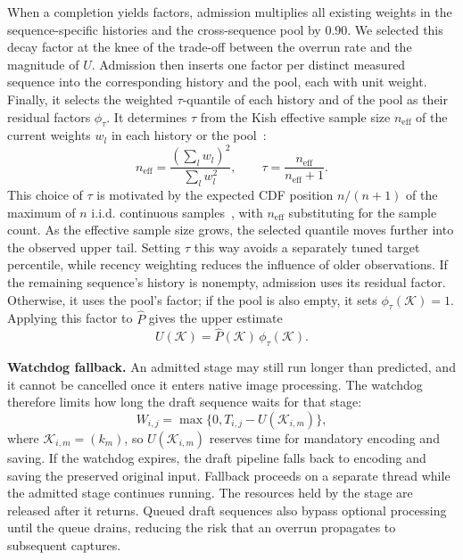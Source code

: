 When a completion yields factors, admission multiplies all existing weights in the sequence-specific histories and the cross-sequence pool by \(0.90\).
We selected this decay factor at the knee of the trade-off between the overrun rate and the magnitude of \(U\).
Admission then inserts one factor per distinct measured sequence into the corresponding history and the pool, each with unit weight.
Finally, it selects the weighted \(\tau\)-quantile of each history and of the pool as their residual factors \(\phi_\tau\).
It determines \(\tau\) from the Kish effective sample size \(n_{\mathrm{eff}}\) of the current weights \(w_l\) in each history or the pool~\cite{kish-survey-sampling}:
\[
  n_{\mathrm{eff}}
  =\frac{(\sum_l w_l)^2}{\sum_l w_l^2},
  \qquad
  \tau=\frac{n_{\mathrm{eff}}}{n_{\mathrm{eff}}+1}.
\]
This choice of \(\tau\) is motivated by the expected CDF position \(n/(n+1)\) of the maximum of \(n\) i.i.d. continuous samples~\cite{david-order-statistics}, with \(n_{\mathrm{eff}}\) substituting for the sample count.
As the effective sample size grows, the selected quantile moves further into the observed upper tail.
Setting \(\tau\) this way avoids a separately tuned target percentile, while recency weighting reduces the influence of older observations.
If the remaining sequence's history is nonempty, admission uses its residual factor.
Otherwise, it uses the pool's factor; if the pool is also empty, it sets \(\phi_\tau(\mathcal K)=1\).
Applying this factor to \(\hat P\) gives the upper estimate
\begin{equation}
  U(\mathcal{K})
  =\hat P(\mathcal{K})\,\phi_{\tau}(\mathcal{K}).
  \label{eq:upper-estimate}
\end{equation}

\smallskip\noindent\textbf{Watchdog fallback.}
An admitted stage may still run longer than predicted, and it cannot be cancelled once it enters native image processing.
The watchdog therefore limits how long the draft sequence waits for that stage:
\begin{equation}
  W_{i,j}=\max\{0,T_{i,j}-U(\mathcal{K}_{i,m})\},
  \label{eq:watchdog}
\end{equation}
where \(\mathcal{K}_{i,m}=(k_m)\), so \(U(\mathcal K_{i,m})\) reserves time for mandatory encoding and saving.
If the watchdog expires, the draft pipeline falls back to encoding and saving the preserved original input.
Fallback proceeds on a separate thread while the admitted stage continues running.
The resources held by the stage are released after it returns.
Queued draft sequences also bypass optional processing until the queue drains, reducing the risk that an overrun propagates to subsequent captures.
